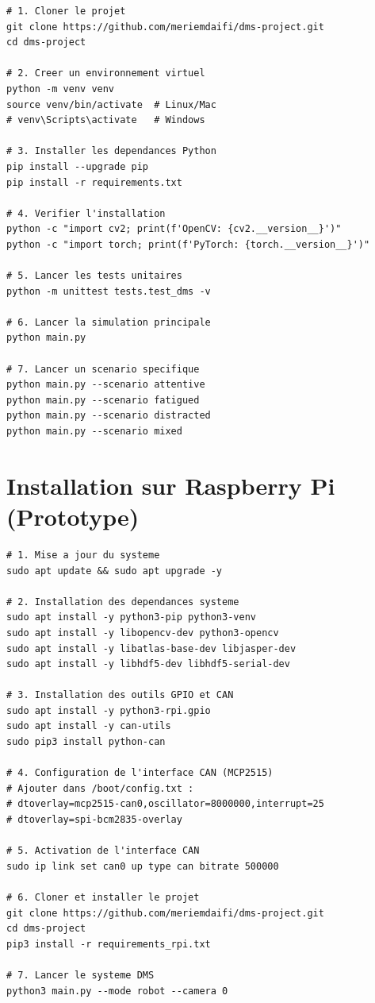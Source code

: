 \documentclass[12pt,a4paper,twoside]{report}
\begin{document}
\begin{lstlisting}[style=pythonstyle, caption={Procédure d'installation complète.}, language={}]
# 1. Cloner le projet
git clone https://github.com/meriemdaifi/dms-project.git
cd dms-project

# 2. Creer un environnement virtuel
python -m venv venv
source venv/bin/activate  # Linux/Mac
# venv\Scripts\activate   # Windows

# 3. Installer les dependances Python
pip install --upgrade pip
pip install -r requirements.txt

# 4. Verifier l'installation
python -c "import cv2; print(f'OpenCV: {cv2.__version__}')"
python -c "import torch; print(f'PyTorch: {torch.__version__}')"

# 5. Lancer les tests unitaires
python -m unittest tests.test_dms -v

# 6. Lancer la simulation principale
python main.py

# 7. Lancer un scenario specifique
python main.py --scenario attentive
python main.py --scenario fatigued
python main.py --scenario distracted
python main.py --scenario mixed
\end{lstlisting}

\section{Installation sur Raspberry Pi (Prototype)}

\begin{lstlisting}[style=pythonstyle, caption={Installation sur Raspberry Pi.}, language={}]
# 1. Mise a jour du systeme
sudo apt update && sudo apt upgrade -y

# 2. Installation des dependances systeme
sudo apt install -y python3-pip python3-venv
sudo apt install -y libopencv-dev python3-opencv
sudo apt install -y libatlas-base-dev libjasper-dev
sudo apt install -y libhdf5-dev libhdf5-serial-dev

# 3. Installation des outils GPIO et CAN
sudo apt install -y python3-rpi.gpio
sudo apt install -y can-utils
sudo pip3 install python-can

# 4. Configuration de l'interface CAN (MCP2515)
# Ajouter dans /boot/config.txt :
# dtoverlay=mcp2515-can0,oscillator=8000000,interrupt=25
# dtoverlay=spi-bcm2835-overlay

# 5. Activation de l'interface CAN
sudo ip link set can0 up type can bitrate 500000

# 6. Cloner et installer le projet
git clone https://github.com/meriemdaifi/dms-project.git
cd dms-project
pip3 install -r requirements_rpi.txt

# 7. Lancer le systeme DMS
python3 main.py --mode robot --camera 0
\end{lstlisting}
\end{document}
